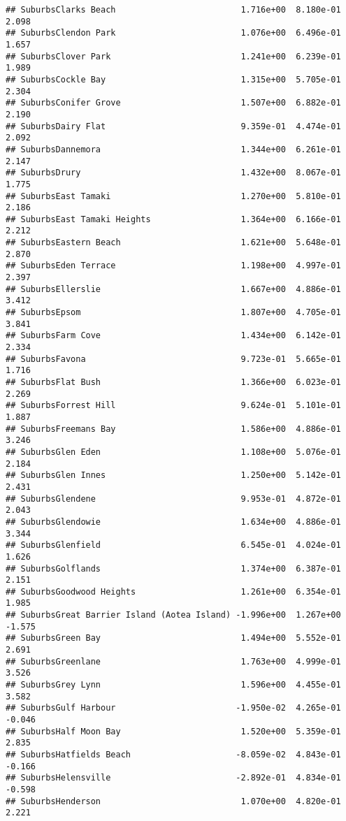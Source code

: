 \documentclass[
]{article}
\begin{document}
\begin{verbatim}
## SuburbsClarks Beach                         1.716e+00  8.180e-01   2.098
## SuburbsClendon Park                         1.076e+00  6.496e-01   1.657
## SuburbsClover Park                          1.241e+00  6.239e-01   1.989
## SuburbsCockle Bay                           1.315e+00  5.705e-01   2.304
## SuburbsConifer Grove                        1.507e+00  6.882e-01   2.190
## SuburbsDairy Flat                           9.359e-01  4.474e-01   2.092
## SuburbsDannemora                            1.344e+00  6.261e-01   2.147
## SuburbsDrury                                1.432e+00  8.067e-01   1.775
## SuburbsEast Tamaki                          1.270e+00  5.810e-01   2.186
## SuburbsEast Tamaki Heights                  1.364e+00  6.166e-01   2.212
## SuburbsEastern Beach                        1.621e+00  5.648e-01   2.870
## SuburbsEden Terrace                         1.198e+00  4.997e-01   2.397
## SuburbsEllerslie                            1.667e+00  4.886e-01   3.412
## SuburbsEpsom                                1.807e+00  4.705e-01   3.841
## SuburbsFarm Cove                            1.434e+00  6.142e-01   2.334
## SuburbsFavona                               9.723e-01  5.665e-01   1.716
## SuburbsFlat Bush                            1.366e+00  6.023e-01   2.269
## SuburbsForrest Hill                         9.624e-01  5.101e-01   1.887
## SuburbsFreemans Bay                         1.586e+00  4.886e-01   3.246
## SuburbsGlen Eden                            1.108e+00  5.076e-01   2.184
## SuburbsGlen Innes                           1.250e+00  5.142e-01   2.431
## SuburbsGlendene                             9.953e-01  4.872e-01   2.043
## SuburbsGlendowie                            1.634e+00  4.886e-01   3.344
## SuburbsGlenfield                            6.545e-01  4.024e-01   1.626
## SuburbsGolflands                            1.374e+00  6.387e-01   2.151
## SuburbsGoodwood Heights                     1.261e+00  6.354e-01   1.985
## SuburbsGreat Barrier Island (Aotea Island) -1.996e+00  1.267e+00  -1.575
## SuburbsGreen Bay                            1.494e+00  5.552e-01   2.691
## SuburbsGreenlane                            1.763e+00  4.999e-01   3.526
## SuburbsGrey Lynn                            1.596e+00  4.455e-01   3.582
## SuburbsGulf Harbour                        -1.950e-02  4.265e-01  -0.046
## SuburbsHalf Moon Bay                        1.520e+00  5.359e-01   2.835
## SuburbsHatfields Beach                     -8.059e-02  4.843e-01  -0.166
## SuburbsHelensville                         -2.892e-01  4.834e-01  -0.598
## SuburbsHenderson                            1.070e+00  4.820e-01   2.221

\end{verbatim}
\end{document}
